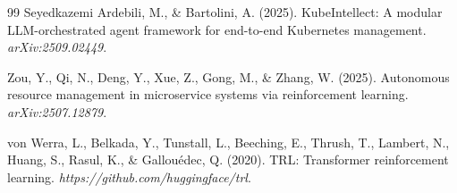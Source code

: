 \documentclass{article}
\begin{document}
\begin{thebibliography}{99}
Seyedkazemi Ardebili, M., \& Bartolini, A. (2025). KubeIntellect: A modular
LLM-orchestrated agent framework for end-to-end Kubernetes management.
\textit{arXiv:2509.02449}.

Zou, Y., Qi, N., Deng, Y., Xue, Z., Gong, M., \& Zhang, W. (2025). Autonomous
resource management in microservice systems via reinforcement learning.
\textit{arXiv:2507.12879}.

von Werra, L., Belkada, Y., Tunstall, L., Beeching, E., Thrush, T., Lambert, N.,
Huang, S., Rasul, K., \& Gallouédec, Q. (2020). TRL: Transformer reinforcement
learning. \textit{https://github.com/huggingface/trl}.

\end{thebibliography}
\end{document}
